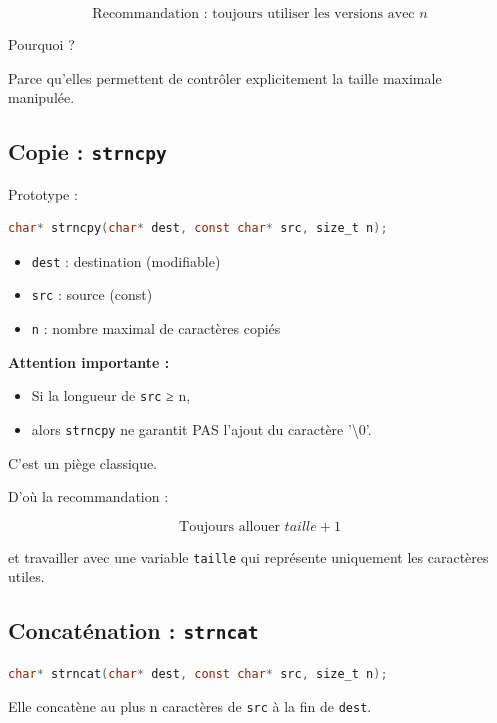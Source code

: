\[
\boxed{\text{Recommandation : toujours utiliser les versions avec } n}
\]

Pourquoi ?

Parce qu’elles permettent de contrôler explicitement
la taille maximale manipulée.

\subsection{Copie : \texttt{strncpy}}

Prototype :

\begin{lstlisting}[language=C]
char* strncpy(char* dest, const char* src, size_t n);
\end{lstlisting}

\begin{itemize}
    \item \texttt{dest} : destination (modifiable)
    \item \texttt{src} : source (const)
    \item \texttt{n} : nombre maximal de caractères copiés
\end{itemize}

\textbf{Attention importante :}

\begin{itemize}
    \item Si la longueur de \texttt{src} ≥ n,
    \item alors \texttt{strncpy} ne garantit PAS l’ajout du caractère '\textbackslash 0'.
\end{itemize}

C’est un piège classique.

D’où la recommandation :

\[
\boxed{\text{Toujours allouer } taille + 1}
\]

et travailler avec une variable \texttt{taille}
qui représente uniquement les caractères utiles.

\subsection{Concaténation : \texttt{strncat}}

\begin{lstlisting}[language=C]
char* strncat(char* dest, const char* src, size_t n);
\end{lstlisting}

Elle concatène au plus n caractères de \texttt{src}
à la fin de \texttt{dest}.

